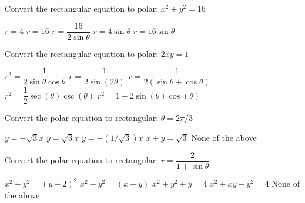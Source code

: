 \documentclass[11pt]{exam}
\begin{document}
\begin{questions}
\begin{minipage}{\linewidth}
\end{minipage}

\begin{minipage}{\linewidth}



\question Convert the rectangular equation to polar: $x^2 + y^2 = 16$

\begin{choices}
	\CorrectChoice $r = 4$
	\choice $r=16$
	\choice $r = \dfrac{16}{2\sin\theta}$
	\choice $r = 4 \sin \theta$
	\choice $r = 16 \sin \theta$
\end{choices} \answerline
\end{minipage}

\begin{minipage}{\linewidth}



\question Convert the rectangular equation to polar: $2xy=1$

\begin{choices}
	\CorrectChoice $r^2 = \dfrac{1}{2\sin\theta\cos\theta}$
	\choice $r = \dfrac{1}{2\sin(2\theta)}$
	\choice $r = \dfrac{1}{2(\sin\theta + \cos\theta)}$
	\choice $r^2 = \dfrac{1}{2}\sec(\theta)\csc(\theta)$
	\choice $r^2 = 1 - 2\sin(\theta)\cos(\theta)$
\end{choices} \answerline
\end{minipage}

\begin{minipage}{\linewidth}


\question Convert the polar equation to rectangular: $\theta = 2\pi/3$

\begin{choices}
	\correctchoice $y = -\sqrt3 x$
	\choice $y = \sqrt3 x$
	\choice $y = -(1/\sqrt3) x$
	\choice $x+y = \sqrt3$
	\choice None of the above
\end{choices} \answerline


\end{minipage}

\begin{minipage}{\linewidth}


\question Convert the polar equation to rectangular: $r = \dfrac{2}{1 + \sin \theta}$

\begin{choices}
	\correctchoice $x^2 + y^2 = (y-2)^2$
	\choice $x^2 - y^2 = (x+y)$
	\choice $x^2+y^2 + y = 4$
	\choice $x^2 + xy - y^2 = 4$
	\choice None of the above
\end{choices} \answerline
\end{minipage}


\end{questions}
\end{document}
